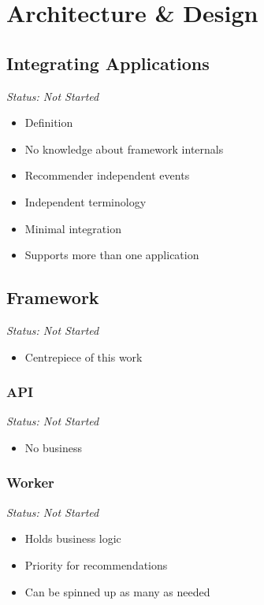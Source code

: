 \chapter{Architecture \& Design}

\section{Integrating Applications}

\emph{Status: Not Started}

\begin{itemize}
\item Definition
\item No knowledge about framework internals
\item Recommender independent events
\item Independent terminology
\item Minimal integration
\item Supports more than one application
\end{itemize}

\section{Framework}

\emph{Status: Not Started}

\begin{itemize}
\item Centrepiece of this work
\end{itemize}

\subsection{API}

\emph{Status: Not Started}

\begin{itemize}
\item No business
\end{itemize}

\subsection{Worker}

\emph{Status: Not Started}

\begin{itemize}
\item Holds business logic
\item Priority for recommendations
\item Can be spinned up as many as needed
\end{itemize}

